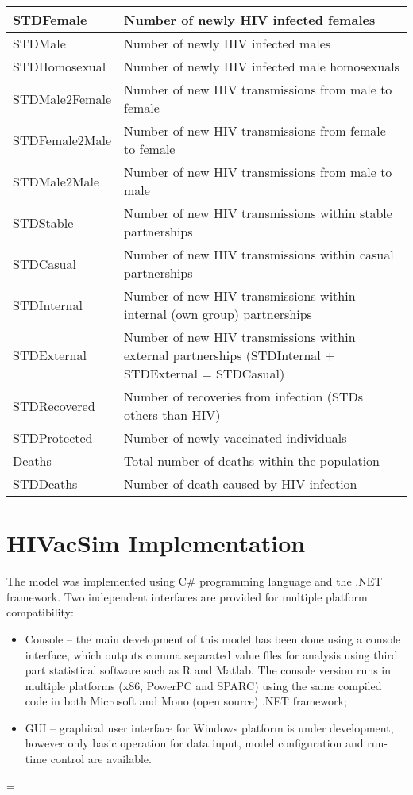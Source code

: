 \begin{longtable}[c]{|l|p{10.9cm}|}
STDFemale       & Number of newly HIV infected females \\\hline
STDMale         & Number of newly HIV infected males \\\hline
STDHomosexual   & Number of newly HIV infected male homosexuals \\\hline
STDMale2Female  & Number of new HIV transmissions from male to female \\\hline
STDFemale2Male  & Number of new HIV transmissions from female to female \\\hline
STDMale2Male    & Number of new HIV transmissions from male to male \\\hline
STDStable       & Number of new HIV transmissions within stable partnerships \\\hline
STDCasual       & Number of new HIV transmissions within casual partnerships \\\hline
STDInternal     & Number of new HIV transmissions within internal (own group) partnerships \\\hline
STDExternal     & Number of new HIV transmissions within external partnerships (STDInternal + STDExternal = STDCasual) \\\hline
STDRecovered    & Number of recoveries from infection (STDs others than HIV) \\\hline
STDProtected    & Number of newly vaccinated individuals \\\hline
Deaths          & Total number of deaths within the population \\\hline
STDDeaths       & Number of death caused by HIV infection \\\hline
\end{longtable}

\section{HIVacSim Implementation}\label{hivacsimsharp}

The model was implemented using C\# programming language and the .NET framework. Two
independent interfaces are provided for multiple platform compatibility:
\parskip=0pt
\begin{itemize}
    \item Console -- the main development of this model has been done using a console interface,
which outputs comma separated value files for analysis using third part statistical
software such as R and Matlab. The console version runs in multiple platforms (x86,
PowerPC and SPARC) using the same compiled code in both Microsoft and Mono (open source)
.NET framework;
    \item GUI -- graphical user interface for Windows platform is under development, however only
basic operation for data input, model configuration and run-time control are available.
\end{itemize}
\parskip=\baselineskip

